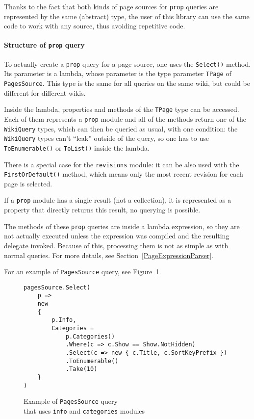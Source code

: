 Thanks to the fact that both kinds of page sources for \texttt{prop} queries are represented by the same
(abstract) type, the user of this library can use the same code to work with any source,
thus avoiding repetitive code.

\paragraph{Structure of \texttt{prop} query}

To actually create a \texttt{prop} query for a page source, one uses the \lstinline{Select()} method.
Its parameter is a lambda, whose parameter is the type parameter \lstinline{TPage} of \lstinline{PagesSource}.
This type is the same for all queries on the same wiki, but could be different for different wikis.

Inside the lambda, properties and methods of the \lstinline{TPage} type can be accessed.
Each of them represents a \texttt{prop} module and all of the methods return one of the \lstinline{WikiQuery} types,
which can then be queried as usual, with one condition:
the \lstinline{WikiQuery} types can't ``leak'' outside of the query, so one has to use \lstinline{ToEnumerable()} or \lstinline{ToList()} inside the lambda.

There is a special case for the \texttt{revisions} module:
it can be also used with the \lstinline{FirstOrDefault()} method,
which means only the most recent revision for each page is selected.

If a \texttt{prop} module has a single result (not a collection), it is represented as a property
that directly returns this result, no querying is possible.

The methods of these \texttt{prop} queries are inside a lambda expression,
so they are not actually executed unless the expression was compiled and the resulting delegate invoked.
Because of this, processing them is not as simple as with normal queries.
For more details, see Section~\ref{PageExpressionParser}.

\medskip

For an example of \lstinline{PagesSource} query, see Figure~\ref{PS query}.

\begin{figure}[htbp]

\begin{lstlisting}
pagesSource.Select(
    p =>
    new
    {
        p.Info,
        Categories =
            p.Categories()
            .Where(c => c.Show == Show.NotHidden)
            .Select(c => new { c.Title, c.SortKeyPrefix })
            .ToEnumerable()
            .Take(10)
	}
)
\end{lstlisting}

\caption{Example of \lstinline{PagesSource} query \\ that uses \texttt{info} and \texttt{categories} modules}
\label{PS query}

\end{figure}

